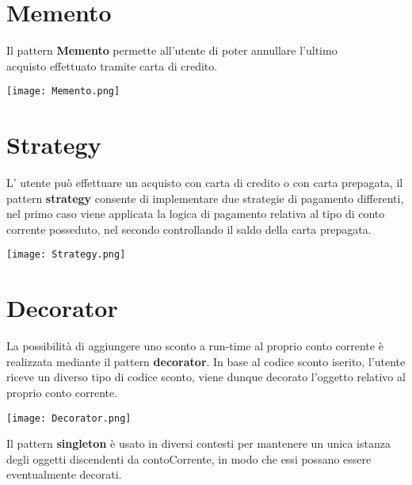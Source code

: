 \section{Memento}
Il pattern \textbf{Memento} permette all'utente di poter annullare l'ultimo \\ acquisto effettuato tramite carta di credito. \\
\begin{center}
\texttt{[image: Memento.png]}
\end{center}

\section{Strategy}
L' utente pu\`{o} effettuare un acquisto con carta di credito o con carta prepagata, il pattern \textbf{strategy} consente di implementare due strategie di pagamento differenti, nel primo caso viene applicata la logica di pagamento relativa al tipo di conto corrente posseduto, nel secondo controllando il saldo della carta prepagata.\\
\begin{center}
\texttt{[image: Strategy.png]}
\end{center}
\newpage
\section{Decorator}
La possibilit\`{a} di aggiungere uno sconto a run-time al proprio conto corrente \`{e} realizzata mediante il pattern \textbf{decorator}. In base al codice sconto iserito, l'utente riceve un diverso tipo di codice sconto, viene dunque decorato l'oggetto relativo al proprio conto corrente.\\
\begin{center}
\texttt{[image: Decorator.png]}
\end{center}

Il pattern \textbf{singleton} \`{e} usato in diversi contesti per mantenere un unica istanza degli oggetti discendenti da contoCorrente, in modo che essi possano essere eventualmente decorati.\\

 